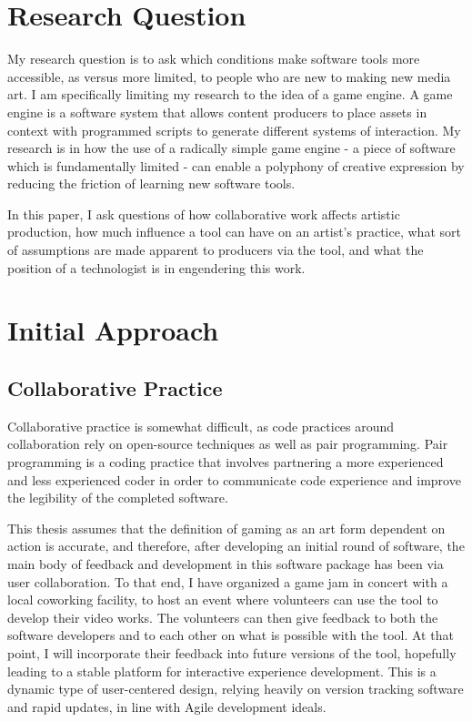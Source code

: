 
\section{Research Question}

My research question is to ask which conditions make software tools more accessible, as versus more limited, to people who are new to making new media art. I am specifically limiting my research to the idea of a game engine. A game engine is a software system that allows content producers to place assets in context with programmed scripts to generate different systems of interaction. My research is in how the use of a radically simple game engine - a piece of software which is fundamentally limited - can enable a polyphony of creative expression by reducing the friction of learning new software tools. 

In this paper, I ask questions of how collaborative work affects artistic production, how much influence a tool can have on an artist's practice, what sort of assumptions are made apparent to producers via the tool, and what the position of a technologist is in engendering this work.



\section{Initial Approach}


\subsection{Collaborative Practice}

Collaborative practice is somewhat difficult, as code practices around collaboration rely on open-source techniques as well as pair programming. Pair programming is a coding practice that involves partnering a more experienced and less experienced coder in order to communicate code experience and improve the legibility of the completed software.

This thesis assumes that the definition of gaming as an art form dependent on action is accurate, and therefore, after developing an initial round of software, the main body of feedback and development in this software package has been via user collaboration. To that end, I have organized a game jam in concert with a local coworking facility, to host an event where volunteers can use the tool to develop their video works. The volunteers can then give feedback to both the software developers and to each other on what is possible with the tool. At that point, I will incorporate their feedback into future versions of the tool, hopefully leading to a stable platform for interactive experience development. This is a dynamic type of user-centered design, relying heavily on version tracking software and rapid updates, in line with Agile development ideals.

